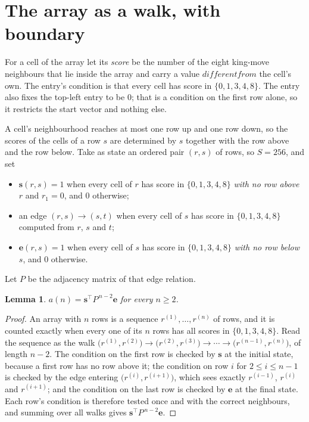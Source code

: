 \documentclass[11pt,a4paper]{article}
\theoremstyle{plain}
\newtheorem{lemma}[theorem]{Lemma}
\theoremstyle{definition}
\begin{document}
\section{The array as a walk, with boundary}

For a cell of the array let its \emph{score} be the number of the eight king-move neighbours that lie inside
the array and carry a value $different from$ the cell's own. The entry's condition is that every cell
has score in $\{0,1,3,4,8\}$. The entry also fixes the top-left entry to be $0$; that is a condition on the first row alone, so it restricts the start vector and nothing else.

A cell's neighbourhood reaches at most one row up and one row down, so the scores of the
cells of a row $s$ are determined by $s$ together with the row above and the row below.
Take as state an ordered pair $(r,s)$ of rows, so $S=256$, and set
\begin{itemize}
\item $\mathbf{s}(r,s)=1$ when every cell of $r$ has score in $\{0,1,3,4,8\}$ \emph{with no row
above $r$} and $r_1=0$, and $0$ otherwise;
\item an edge $(r,s)\to(s,t)$ when every cell of $s$ has score in $\{0,1,3,4,8\}$ computed from
$r$, $s$ and $t$;
\item $\mathbf{e}(r,s)=1$ when every cell of $s$ has score in $\{0,1,3,4,8\}$ \emph{with no row
below $s$}, and $0$ otherwise.
\end{itemize}
Let $P$ be the adjacency matrix of that edge relation.

\begin{lemma}\label{lem:walk}
$a(n)=\mathbf{s}^{\!\top}P^{\,n-2}\mathbf{e}$ for every $n\ge2$.
\end{lemma}

\begin{proof}
An array with $n$ rows is a sequence $r^{(1)},\dots,r^{(n)}$ of rows, and it is counted
exactly when every one of its $n$ rows has all scores in $\{0,1,3,4,8\}$. Read the sequence as the
walk $\bigl(r^{(1)},r^{(2)}\bigr)\to\bigl(r^{(2)},r^{(3)}\bigr)\to\cdots\to
\bigl(r^{(n-1)},r^{(n)}\bigr)$, of length $n-2$. The condition on the first row is
checked by $\mathbf{s}$ at the initial state, because a first row has no row above it; the
condition on row $i$ for $2\le i\le n-1$ is checked by the edge entering
$\bigl(r^{(i)},r^{(i+1)}\bigr)$, which sees exactly $r^{(i-1)}$, $r^{(i)}$ and
$r^{(i+1)}$; and the condition on the last row is checked by $\mathbf{e}$ at the final
state. Each row's condition is therefore tested once and with the correct neighbours, and
summing over all walks gives $\mathbf{s}^{\!\top}P^{\,n-2}\mathbf{e}$.
\end{proof}
\end{document}
